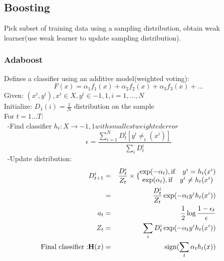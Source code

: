 \documentclass[12pt,a4paper]{article}
\begin{document}
\subsection*{Boosting}
Pick subset of training data using a sampling distribution, obtain weak learner(use weak learner to update sampling distribution).\\
\subsubsection*{Adaboost}
Defines a classifier using an additive model(weighted voting):
$$
F(x) = \alpha_1f_1(x)+\alpha_2f_2(x)+\alpha_3f_3(x)+\ldots
$$
Given: $(x^i,y^i),x^i\in X, y^i\in{-1,1},i=1,\ldots,N$\\
Initialize: $D_1(i)=\frac{1}{N}$ distribution on the sample\\
For $t=1\ldots T$:\\
\ -Find classifier $h_t:X\rightarrow {-1,1} with smallest weighted error$\\
$$
\epsilon = \frac{\sum_{i=1}^{N}D_t^i[y^i\neq_t(x^i)]}{\sum_{i}{D_t^i}}
$$
\ -Update distribution: 
\begin{eqnarray*}
D_{t+1}^i &=& \frac{D_t^i}{Z_t}\times \{\begin{matrix}
\exp(-\alpha_t), {\rm if} \quad y^i = h_t(x^i)\\
\exp(\alpha_t), {\rm if} \quad y^i \neq h_t(x^i)
\end{matrix} \\
 &=& \frac{D_t^i}{Z_t}\exp(-\alpha_ty^ih_t(x^i)) \\
a_t &=& \frac{1}{2}\log\frac{1-\epsilon_t}{\epsilon}\\
Z_t &=& \sum_i D^i_t\exp(-\alpha_ty^ih_t(x^i))\\
{\rm Final\  classifier :} {\bf H}(x) &=&{\rm sign}(\sum_{t}\alpha_th_t(x)) 
\end{eqnarray*}
\end{document}
